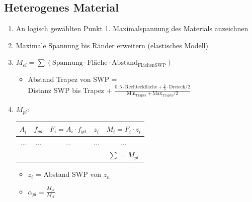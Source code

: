 \documentclass[fleqn,twoside]{article}
\begin{document}
    \subsection{Heterogenes Material}
    \begin{minipage}{0.80\textwidth}
        \begin{enumerate}
            \item An logisch gewählten Punkt 1. Maximalspannung des Materials anzeichnen 
            \item Maximale Spannung bis Ränder erweitern (elastisches Modell)
            \item $M_{el} = \sum(\text{Spannung} \cdot \text{Fläche} \cdot \text{Abstand}_{\text{FlächenSWP}} )$
                \begin{itemize}
                    \item Abstand Trapez von SWP = \\ Distanz SWP bis Trapez + $\frac{0,5 \cdot \text{Rechteckfläche} + \frac{2}{3} \cdot \text{Dreieck} / 2}{\text{Min}_{\text{Trapez}}+\text{Max}_{\text{Trapez}} / 2}$
                \end{itemize}
            \item $M_{pl}:$\\
                    \begin{tabular}{cccc|c|}
                        \hline
                        \multicolumn{1}{|c|}{$A_i$} & \multicolumn{1}{c|}{$f_{yd}$} & \multicolumn{1}{c|}{$F_i = A_i \cdot f_{yd}$} & $z_i$ & $M_i = F_i \cdot z_i$ \\ \hline
                        \multicolumn{1}{|c|}{...}   & \multicolumn{1}{c|}{...}      & \multicolumn{1}{c|}{...}                      & ...   & ...                   \\ \hline
                                                    &                               &                                               &       & $\sum = M_{pl}$       \\ \cline{5-5} 
                    \end{tabular}
                \begin{itemize}
                    \item $z_i$ = Abstand SWP von $z_n$
                    \item $\alpha_{pl} = \frac{M_{pl}}{M_{el}}$
                \end{itemize}
                
        \end{enumerate}
    \end{minipage}		
\end{document}

